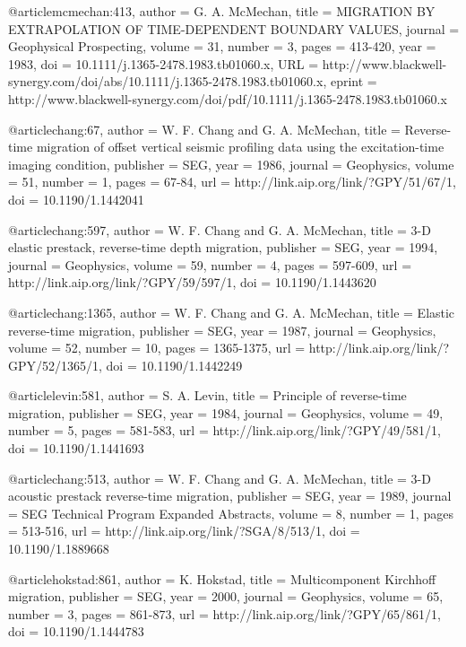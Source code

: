 {@article{mcmechan:413,
  author =	 {G. A. McMechan},
  title =	 {MIGRATION BY EXTRAPOLATION OF TIME-DEPENDENT
                  BOUNDARY VALUES},
  journal =	 {Geophysical Prospecting},
  volume =	 31,
  number =	 3,
  pages =	 {413-420},
  year =	 1983,
  doi =		 {10.1111/j.1365-2478.1983.tb01060.x},
  URL =
                  {http://www.blackwell-synergy.com/doi/abs/10.1111/j.1365-2478.1983.tb01060.x},
  eprint =
                  {http://www.blackwell-synergy.com/doi/pdf/10.1111/j.1365-2478.1983.tb01060.x}
}

@article{chang:67,
  author =	 {W. F. Chang and G. A. McMechan},
  title =	 {Reverse-time migration of offset vertical seismic
                  profiling data using the excitation-time imaging
                  condition},
  publisher =	 {SEG},
  year =	 1986,
  journal =	 {Geophysics},
  volume =	 51,
  number =	 1,
  pages =	 {67-84},
  url =		 {http://link.aip.org/link/?GPY/51/67/1},
  doi =		 {10.1190/1.1442041}
}

@article{chang:597,
  author =	 {W. F. Chang and G. A. McMechan},
  title =	 {3-{D} elastic prestack, reverse-time depth
                  migration},
  publisher =	 {SEG},
  year =	 1994,
  journal =	 {Geophysics},
  volume =	 59,
  number =	 4,
  pages =	 {597-609},
  url =		 {http://link.aip.org/link/?GPY/59/597/1},
  doi =		 {10.1190/1.1443620}
}

@article{chang:1365,
  author =	 {W. F. Chang and G. A. McMechan},
  title =	 {Elastic reverse-time migration},
  publisher =	 {SEG},
  year =	 1987,
  journal =	 {Geophysics},
  volume =	 52,
  number =	 10,
  pages =	 {1365-1375},
  url =		 {http://link.aip.org/link/?GPY/52/1365/1},
  doi =		 {10.1190/1.1442249}
}

@article{levin:581,
  author =	 {S. A. Levin},
  title =	 {Principle of reverse-time migration},
  publisher =	 {SEG},
  year =	 1984,
  journal =	 {Geophysics},
  volume =	 49,
  number =	 5,
  pages =	 {581-583},
  url =		 {http://link.aip.org/link/?GPY/49/581/1},
  doi =		 {10.1190/1.1441693}
}

@article{chang:513,
  author =	 {W. F. Chang and G. A. McMechan},
  title =	 {3-{D} acoustic prestack reverse-time migration},
  publisher =	 {SEG},
  year =	 1989,
  journal =	 {SEG Technical Program Expanded Abstracts},
  volume =	 8,
  number =	 1,
  pages =	 {513-516},
  url =		 {http://link.aip.org/link/?SGA/8/513/1},
  doi =		 {10.1190/1.1889668}
}

@article{hokstad:861,
  author =	 {K. Hokstad},
  title =	 {Multicomponent {K}irchhoff migration},
  publisher =	 {SEG},
  year =	 2000,
  journal =	 {Geophysics},
  volume =	 65,
  number =	 3,
  pages =	 {861-873},
  url =		 {http://link.aip.org/link/?GPY/65/861/1},
  doi =		 {10.1190/1.1444783}
}

}
